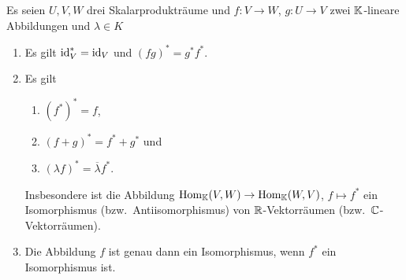 \begin{proposition}
  Es seien $U, V, W$ drei Skalarprodukträume und $f \colon V \to W$, $g \colon U \to V$ zwei $\mathbb{K}$-lineare Abbildungen und $\lambda \in K$
  \begin{enumerate}[leftmargin=*, label=\roman*)]
    \item
      Es gilt $\operatorname{id}_V^* = \operatorname{id}_V$ und $(fg)^* = g^* f^*$.
    \item
      Es gilt
      \begin{enumerate}[leftmargin=*, label=\alph*)]
        \item
          $(f^*)^* = f$,
        \item
          $(f + g)^* = f^* + g^*$ und
        \item
          $(\lambda f)^* = \overline{\lambda} f^*$.
      \end{enumerate}
      Insbesondere ist die Abbildung $\operatorname{Hom}_{\mathbb{K}}(V,W) \to \operatorname{Hom}_{\mathbb{K}}(W,V)$, $f \mapsto f^*$ ein Isomorphismus (bzw.\ Antiisomorphismus) von $\mathbb{R}$-Vektorräumen (bzw.\ $\mathbb{C}$-Vektorräumen).
    \item
      Die Abbildung $f$ ist genau dann ein Isomorphismus, wenn $f^*$ ein Isomorphismus ist.
  \end{enumerate}
\end{proposition}


